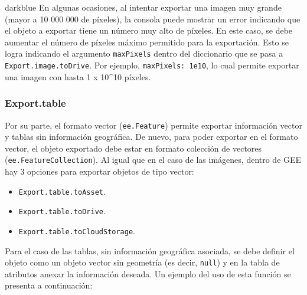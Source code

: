 \documentclass[
  12pt,
  letterpaper,
  twoside]{book}
\providecommand{\tightlist}{%
  \setlength{\itemsep}{0pt}\setlength{\parskip}{0pt}}
\begin{document}
\begin{bluebox2}

\begin{awesomeblock}{5pt}{\faLightbulb}{darkblue}
En algunas ocasiones, al intentar exportar una imagen muy grande (mayor a 10 000 000 de píxeles), la consola puede mostrar un error indicando que el objeto a exportar tiene un número muy alto de píxeles. En este caso, se debe aumentar el número de píxeles máximo permitido para la exportación. Esto se logra indicando el argumento \texttt{maxPixels} dentro del diccionario que se pasa a \texttt{Export.image.toDrive}. Por ejemplo, \texttt{maxPixels:\ 1e10}, lo cual permite exportar una imagen con hasta 1 x 10\^{}10 píxeles.

\end{awesomeblock}

\end{bluebox2}

\hypertarget{export.table}{%
\subsubsection*{Export.table}\label{export.table}}

Por su parte, el formato vector (\texttt{ee.Feature}) permite exportar información vector y tablas sin información geográfica. De nuevo, para poder exportar en el formato vector, el objeto exportado debe estar en formato colección de vectores (\texttt{ee.FeatureCollection}). Al igual que en el caso de las imágenes, dentro de GEE hay 3 opciones para exportar objetos de tipo vector:

\begin{itemize}
\tightlist
\item
  \texttt{Export.table.toAsset}.
\item
  \texttt{Export.table.toDrive}.
\item
  \texttt{Export.table.toCloudStorage}.
\end{itemize}

Para el caso de las tablas, sin información geográfica asociada, se debe definir el objeto como un objeto vector sin geometría (es decir, \texttt{null}) y en la tabla de atributos anexar la información deseada. Un ejemplo del uso de esta función se presenta a continuación:
\end{document}
